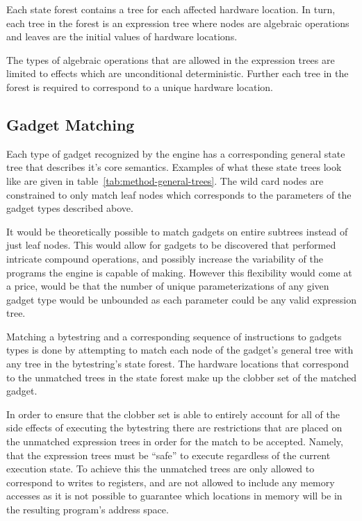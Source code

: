     Each state forest contains a tree for each affected hardware location.  In
    turn, each tree in the forest is an expression tree where nodes are
    algebraic operations and leaves are the initial values of hardware
    locations.

    The types of algebraic operations that are allowed in the expression trees
    are limited to effects which are unconditional deterministic. Further each
    tree in the forest is required to correspond to a unique hardware location.

    
    \subsection{Gadget Matching}

    Each type of gadget recognized by the engine has a corresponding general
    state tree that describes it's core semantics. Examples of what these
    state trees look like are given in table~\ref{tab:method-general-trees}. The
    wild card nodes are constrained to only match leaf nodes which corresponds
    to the parameters of the gadget types described above.

    It would be theoretically possible to match gadgets on entire subtrees
    instead of just leaf nodes. This would allow for gadgets to be discovered
    that performed intricate compound operations, and possibly increase the
    variability of the programs the engine is capable of making. However this
    flexibility would come at a price, would be that the number of unique
    parameterizations of any given gadget type would be unbounded as each
    parameter could be any valid expression tree.


    Matching a bytestring and a corresponding sequence of instructions to
    gadgets types is done by attempting to match each node of the gadget's
    general tree with any tree in the bytestring's state forest. The hardware
    locations that correspond to the unmatched trees in the state forest make up
    the clobber set of the matched gadget.

    In order to ensure that the clobber set is able to entirely account for all
    of the side effects of executing the bytestring there are restrictions that
    are placed on the unmatched expression trees in order for the match to be
    accepted. Namely, that the expression trees must be ``safe'' to execute
    regardless of the current execution state. To achieve this the unmatched
    trees are only allowed to correspond to writes to registers, and are not
    allowed to include any memory accesses as it is not possible to guarantee
    which locations in memory will be in the resulting program's address space.

